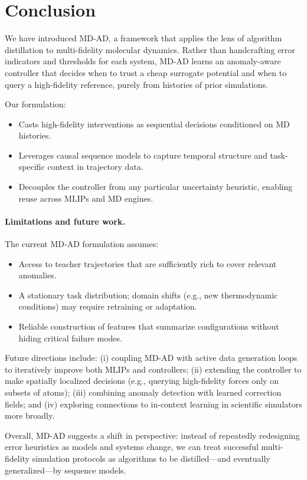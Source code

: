 \documentclass{article}
\begin{document}
\section{Conclusion}
\label{sec:conclusion}

We have introduced MD-AD, a framework that applies the lens of algorithm distillation to multi-fidelity molecular dynamics. Rather than handcrafting error indicators and thresholds for each system, MD-AD learns an anomaly-aware controller that decides when to trust a cheap surrogate potential and when to query a high-fidelity reference, purely from histories of prior simulations.

Our formulation:
\begin{itemize}
    \item Casts high-fidelity interventions as sequential decisions conditioned on MD histories.
    \item Leverages causal sequence models to capture temporal structure and task-specific context in trajectory data.
    \item Decouples the controller from any particular uncertainty heuristic, enabling reuse across MLIPs and MD engines.
\end{itemize}

\paragraph{Limitations and future work.}
The current MD-AD formulation assumes:
\begin{itemize}
    \item Access to teacher trajectories that are sufficiently rich to cover relevant anomalies.
    \item A stationary task distribution; domain shifts (e.g., new thermodynamic conditions) may require retraining or adaptation.
    \item Reliable construction of features that summarize configurations without hiding critical failure modes.
\end{itemize}
Future directions include: (i) coupling MD-AD with active data generation loops to iteratively improve both MLIPs and controllers; (ii) extending the controller to make spatially localized decisions (e.g., querying high-fidelity forces only on subsets of atoms); (iii) combining anomaly detection with learned correction fields; and (iv) exploring connections to in-context learning in scientific simulators more broadly.

Overall, MD-AD suggests a shift in perspective: instead of repeatedly redesigning error heuristics as models and systems change, we can treat successful multi-fidelity simulation protocols as algorithms to be distilled---and eventually generalized---by sequence models.

\nocite{*}


\end{document}

